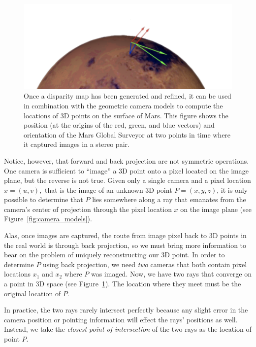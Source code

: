 \begin{figure}[tb]
  \centering
  \includegraphics[width=12cm]{images/correlation/triangulation_400px.png}
  \caption{Once a disparity map has been generated and refined, it can
    be used in combination with the geometric camera models to compute
    the locations of 3D points on the surface of Mars.  This figure
    shows the position (at the origins of the red, green, and blue vectors) and
	orientation of the Mars Global Surveyor at
    two points in time where it captured images in a stereo pair.}
  \label{fig:triangulation}
\end{figure}

Notice, however, that forward and back projection are not symmetric
operations.  One camera is sufficient to ``image'' a 3D point onto a
pixel located on the image plane, but the reverse is not true.  Given
only a single camera and a pixel location $x = (u,v),$ that is the
image of an unknown 3D point $P = (x,y,z)$, it is only possible to
determine that $P$ lies somewhere along a ray that emanates from the
camera's center of projection through the pixel location $x$ on the
image plane (see Figure~\ref{fig:camera_models}).

Alas, once images are captured, the route from image pixel back to 3D
points in the real world is through back projection, so we must bring
more information to bear on the problem of uniquely reconstructing our
3D point.  In order to determine $P$ using back projection, we need
{\em two} cameras that both contain pixel locations $x_1$ and $x_2$
where $P$ was imaged.  Now, we have two rays that converge on a point
in 3D space (see Figure~\ref{fig:triangulation}). The location where
they meet must be the original location of $P$.

In practice, the two rays rarely intersect perfectly because any
slight error in the camera position or pointing information will
effect the rays' positions as well.  Instead, we take the {\em closest
  point of intersection} of the two rays as the location of point
$P$.

